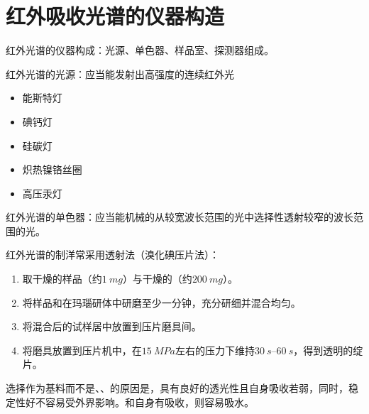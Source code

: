 \section{红外吸收光谱的仪器构造}
红外光谱的仪器构成：光源、单色器、样品室、探测器组成。

红外光谱的光源：应当能发射出高强度的连续红外光
\begin{itemize}
    \item 能斯特灯
    \item 碘钙灯
    \item 硅碳灯
    \item 炽热镍铬丝圈
    \item 高压汞灯
\end{itemize}
红外光谱的单色器：应当能机械的从较宽波长范围的光中选择性透射较窄的波长范围的光。

红外光谱的制洋常采用透射法（溴化碘压片法）：
\begin{enumerate}
    \item 取干燥的样品（约$\SI{1}{mg}$）与干燥的（约$\SI{200}{mg}$）。
    \item 将样品和在玛瑙研体中研磨至少一分钟，充分研细并混合均匀。
    \item 将混合后的试样居中放置到压片磨具间。
    \item 将磨具放置到压片机中，在$\SI{15}{MPa}$左右的压力下维持$\SIrange{30}{60}{s}$，得到透明的绽片。
\end{enumerate}
选择作为基料而不是、、的原因是，具有良好的透光性且自身吸收若弱，同时，稳定性好不容易受外界影响。和自身有吸收，则容易吸水。